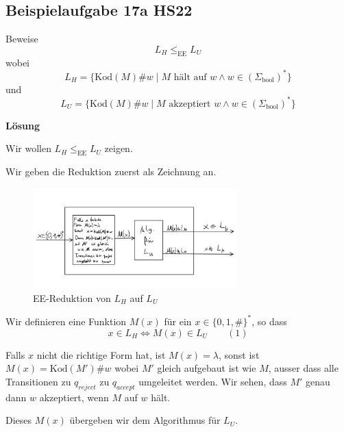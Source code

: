 \documentclass[a4paper, 11pt]{article}
\begin{document}
            
            
                \subsection{Beispielaufgabe 17a HS22}

                Beweise $$L_H \leq_{\text{EE}} L_U$$
                wobei 
                $$L_H = \{\text{Kod}(M)\#w \mid M\text{ hält auf }w\land w \in (\Sigma_{\text{bool}})^*\}$$
                und 
                $$L_U=\{\text{Kod}(M)\#w \mid M \text{ akzeptiert }w \land w \in (\Sigma_{\text{bool}})^*\}$$
            
            
                \textbf{Lösung}
            
                Wir wollen $L_H \leq_{\text{EE}} L_U$ zeigen.
            
                    Wir geben die Reduktion zuerst als Zeichnung an.
            
                    \begin{figure}[htp]
                        \centering
                        \includegraphics[width = 0.7\textwidth]{Images/17a_Zeichnung.png}
                        \caption{EE-Reduktion von $L_H$ auf $L_U$}
                    \end{figure}
                    
        
                Wir definieren eine Funktion $M(x)$ für ein $x \in \{0,1,\#\}^*$, so dass
                    $$x \in L_H \iff M(x) \in L_U \qquad (1)$$
                
                    Falls $x$ nicht die richtige Form hat, ist $M(x) = \lambda$, sonst ist $M(x) = \text{Kod}(M')\#w$ wobei $M'$ gleich aufgebaut ist wie $M$, ausser dass alle Transitionen zu $q_{reject}$ zu $q_{accept}$ umgeleitet werden. Wir sehen, dass $M'$ genau dann $w$ akzeptiert, wenn $M$ auf $w$ hält. 
                    
                    Dieses $M(x)$ übergeben wir dem Algorithmus für $L_U$. 
            
\end{document}
